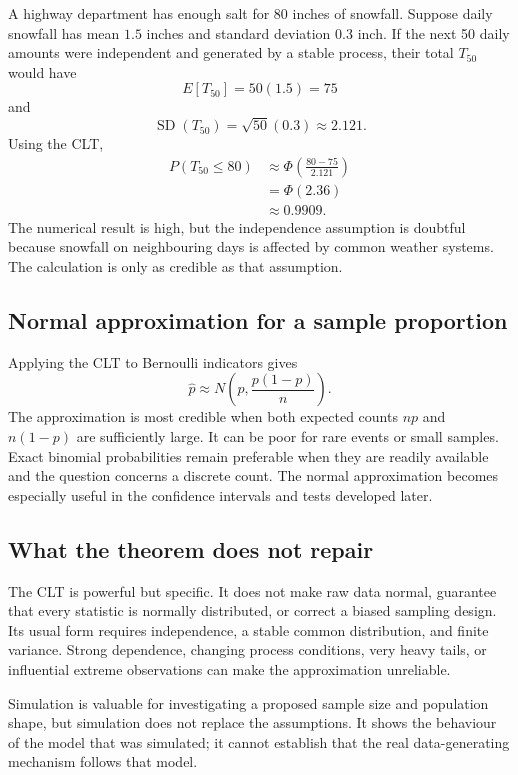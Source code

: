 \begin{example}\par
A highway department has enough salt for 80 inches of snowfall. Suppose daily snowfall has mean $1.5$ inches and standard deviation $0.3$ inch. If the next 50 daily amounts were independent and generated by a stable process, their total $T_{50}$ would have
\[
    E[T_{50}]=50(1.5)=75
\]
and
\[
    \operatorname{SD}(T_{50})=\sqrt{50}(0.3)\approx2.121.
\]
Using the CLT,
\[
\begin{aligned}
P(T_{50}\leq80)
  &\approx\Phi\!\left(\frac{80-75}{2.121}\right)\\
  &=\Phi(2.36)\\
  &\approx0.9909.
\end{aligned}
\]
The numerical result is high, but the independence assumption is doubtful because snowfall on neighbouring days is affected by common weather systems. The calculation is only as credible as that assumption.
\end{example}

\subsection{Normal approximation for a sample proportion}

Applying the CLT to Bernoulli indicators gives
\[
    \widehat p\approx N\!\left(p,\frac{p(1-p)}{n}\right).
\]
The approximation is most credible when both expected counts $np$ and $n(1-p)$ are sufficiently large. It can be poor for rare events or small samples. Exact binomial probabilities remain preferable when they are readily available and the question concerns a discrete count. The normal approximation becomes especially useful in the confidence intervals and tests developed later.

\subsection{What the theorem does not repair}

The CLT is powerful but specific. It does not make raw data normal, guarantee that every statistic is normally distributed, or correct a biased sampling design. Its usual form requires independence, a stable common distribution, and finite variance. Strong dependence, changing process conditions, very heavy tails, or influential extreme observations can make the approximation unreliable.

Simulation is valuable for investigating a proposed sample size and population shape, but simulation does not replace the assumptions. It shows the behaviour of the model that was simulated; it cannot establish that the real data-generating mechanism follows that model.

